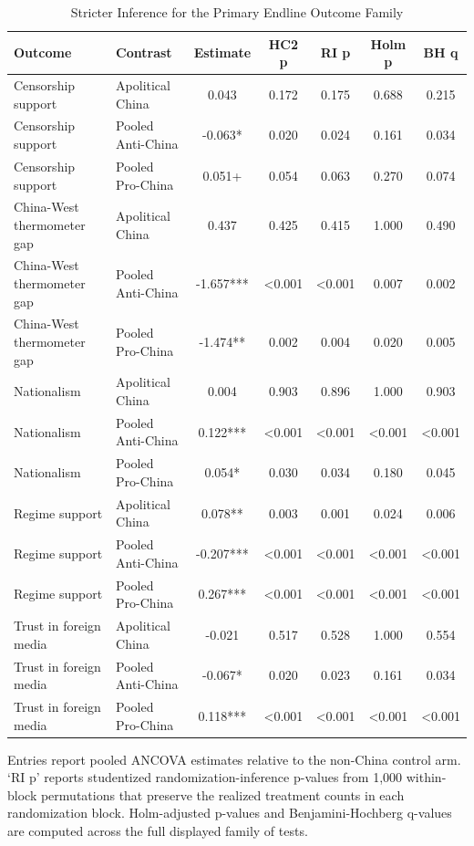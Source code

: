 \begin{table}[H]
\centering
\caption{Stricter Inference for the Primary Endline Outcome Family}
\label{tab:strict_primary_family_t1}
\footnotesize
\begin{threeparttable}
\begin{tabular}{llccccc}
\toprule
Outcome & Contrast & Estimate & HC2 p & RI p & Holm p & BH q \\
\midrule
Censorship support & Apolitical China & 0.043 & 0.172 & 0.175 & 0.688 & 0.215 \\
Censorship support & Pooled Anti-China & -0.063* & 0.020 & 0.024 & 0.161 & 0.034 \\
Censorship support & Pooled Pro-China & 0.051+ & 0.054 & 0.063 & 0.270 & 0.074 \\
China-West thermometer gap & Apolitical China & 0.437 & 0.425 & 0.415 & 1.000 & 0.490 \\
China-West thermometer gap & Pooled Anti-China & -1.657*** & <0.001 & <0.001 & 0.007 & 0.002 \\
China-West thermometer gap & Pooled Pro-China & -1.474** & 0.002 & 0.004 & 0.020 & 0.005 \\
Nationalism & Apolitical China & 0.004 & 0.903 & 0.896 & 1.000 & 0.903 \\
Nationalism & Pooled Anti-China & 0.122*** & <0.001 & <0.001 & <0.001 & <0.001 \\
Nationalism & Pooled Pro-China & 0.054* & 0.030 & 0.034 & 0.180 & 0.045 \\
Regime support & Apolitical China & 0.078** & 0.003 & 0.001 & 0.024 & 0.006 \\
Regime support & Pooled Anti-China & -0.207*** & <0.001 & <0.001 & <0.001 & <0.001 \\
Regime support & Pooled Pro-China & 0.267*** & <0.001 & <0.001 & <0.001 & <0.001 \\
Trust in foreign media & Apolitical China & -0.021 & 0.517 & 0.528 & 1.000 & 0.554 \\
Trust in foreign media & Pooled Anti-China & -0.067* & 0.020 & 0.023 & 0.161 & 0.034 \\
Trust in foreign media & Pooled Pro-China & 0.118*** & <0.001 & <0.001 & <0.001 & <0.001 \\
\bottomrule
\end{tabular}
\begin{tablenotes}[flushleft]
\footnotesize
\item Entries report pooled ANCOVA estimates relative to the non-China control arm. `RI p' reports studentized randomization-inference p-values from 1,000 within-block permutations that preserve the realized treatment counts in each randomization block. Holm-adjusted p-values and Benjamini-Hochberg q-values are computed across the full displayed family of tests.
\end{tablenotes}
\end{threeparttable}
\end{table}
